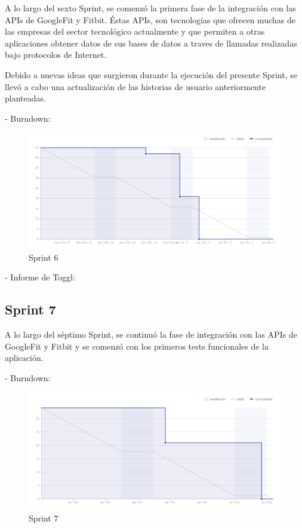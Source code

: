 \documentclass[11pt,openany]{book}
\begin{document}
A lo largo del sexto Sprint, se comenzó la primera fase de la integración con las APIs de GoogleFit y Fitbit. Éstas APIs, son tecnologías que ofrecen muchas de las empresas del sector tecnológico actualmente y que permiten a otras aplicaciones obtener datos de sus bases de datos a traves de llamadas realizadas bajo protocolos de Internet. 

Debido a nuevas ideas que surgieron durante la ejecución del presente Sprint, se llevó a cabo una actualización de las historias de usuario anteriormente planteadas.

- Burndown:

\begin{figure}[H]
\centering
\includegraphics[totalheight=7cm]{burndowns/Sprint6.png}
\caption{Sprint 6}
\end{figure}

- Informe de Toggl:



\subsection{Sprint 7}

A lo largo del séptimo Sprint, se continuó la fase de integración con las APIs de GoogleFit y Fitbit y se comenzó con los primeros tests funcionales de la aplicación.

- Burndown:

\begin{figure}[H]
\centering
\includegraphics[totalheight=7cm]{burndowns/Sprint7.png}
\caption{Sprint 7}
\end{figure}
\end{document}
